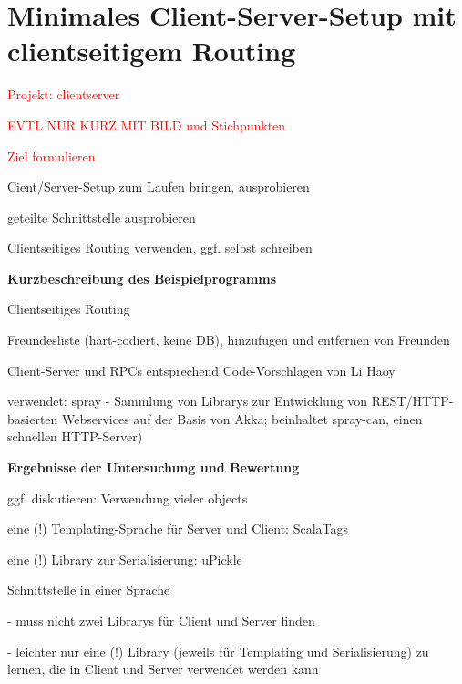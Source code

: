 \documentclass[a4paper, 12pt, hidelinks, listof=totoc, listoftables=totoc, bibliography=totoc]{scrreprt}
\newcommand{\TODO}[1]{\textcolor{red}{#1}\newline}
\newcommand{\MyMiniSec}[1]{\rmfamily\fontsize{12}{15}\selectfont
	\vspace{7pt}\textbf{#1} %
}
\begin{document}
\section{Minimales Client-Server-Setup mit clientseitigem Routing}


\TODO{Projekt: clientserver}

\TODO{EVTL NUR KURZ MIT BILD und Stichpunkten}


\TODO{Ziel formulieren}

Cient/Server-Setup zum Laufen bringen, ausprobieren

geteilte Schnittstelle ausprobieren

Clientseitiges Routing verwenden, ggf. selbst schreiben

\MyMiniSec{Kurzbeschreibung des Beispielprogramms}

Clientseitiges Routing

Freundesliste (hart-codiert, keine DB), hinzufügen und entfernen von Freunden

Client-Server und RPCs entsprechend Code-Vorschlägen von Li Haoy\cite[]{haoyi.HOS}

verwendet: spray - Sammlung von Librarys zur Entwicklung von REST/HTTP-basierten Webservices auf der Basis von Akka; beinhaltet spray-can, einen schnellen HTTP-Server)

\MyMiniSec{Ergebnisse der Untersuchung und Bewertung}


ggf. diskutieren: Verwendung vieler objects

eine (!) Templating-Sprache für Server und Client: ScalaTags \cite{haoyi.HOS}

eine (!) Library zur Serialisierung: uPickle \cite{haoyi.HOS}

Schnittstelle in einer Sprache

- muss nicht zwei Librarys für Client und Server finden

- leichter nur eine (!) Library (jeweils für Templating und Serialisierung) zu lernen, die in Client und Server verwendet werden kann
\cite[\#SharingCode]{haoyi.HOS}
\end{document}

